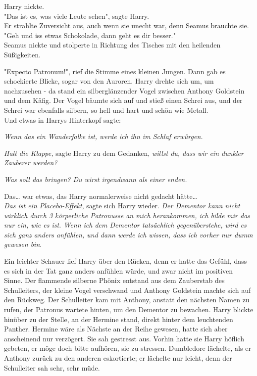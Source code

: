 {Harry nickte.\\ "Das ist es, was viele Leute sehen", sagte Harry.\\ Er strahlte Zuversicht aus, auch wenn sie unecht war, denn Seamus brauchte sie.\\ "Geh und iss etwas Schokolade, dann geht es dir besser."\\ Seamus nickte und stolperte in Richtung des Tisches mit den heilenden Süßigkeiten.

"Expecto Patronum!", rief die Stimme eines kleinen Jungen. Dann gab es schockierte Blicke, sogar von den Auroren. Harry drehte sich um, um nachzusehen - da stand ein silberglänzender Vogel zwischen Anthony Goldstein und dem Käfig. Der Vogel bäumte sich auf und stieß einen Schrei aus, und der Schrei war ebenfalls silbern, so hell und hart und schön wie Metall.\\ Und etwas in Harrys Hinterkopf sagte:

\emph{Wenn das ein Wanderfalke ist, werde ich ihn im Schlaf erwürgen.}

\emph{Halt die Klappe,} sagte Harry zu dem Gedanken, \emph{willst du, dass wir ein dunkler Zauberer werden?}

\emph{Was soll das bringen? Du wirst irgendwann als einer enden.}

Das… war etwas, das Harry normalerweise nicht gedacht hätte…\\ \emph{Das ist ein Placebo-Effekt}, sagte sich Harry wieder. \emph{Der Dementor kann nicht wirklich durch 3 körperliche Patronusse an mich herankommen, ich bilde mir das nur ein, wie es ist. Wenn ich dem Dementor tatsächlich gegenüberstehe, wird es sich ganz anders anfühlen, und dann werde ich wissen, dass ich vorher nur dumm gewesen bin}.

Ein leichter Schauer lief Harry über den Rücken, denn er hatte das Gefühl, dass es sich in der Tat ganz anders anfühlen würde, und zwar nicht im positiven Sinne. Der flammende silberne Phönix entstand aus dem Zauberstab des Schulleiters, der kleine Vogel verschwand und Anthony Goldstein machte sich auf den Rückweg. Der Schulleiter kam mit Anthony, anstatt den nächsten Namen zu rufen, der Patronus wartete hinten, um den Dementor zu bewachen. Harry blickte hinüber zu der Stelle, an der Hermine stand, direkt hinter dem leuchtenden Panther. Hermine wäre als Nächste an der Reihe gewesen, hatte sich aber anscheinend nur verzögert. Sie sah gestresst aus. Vorhin hatte sie Harry höflich gebeten, er möge doch bitte aufhören, sie zu stressen. Dumbledore lächelte, als er Anthony zurück zu den anderen eskortierte; er lächelte nur leicht, denn der Schulleiter sah sehr, sehr müde.

}
